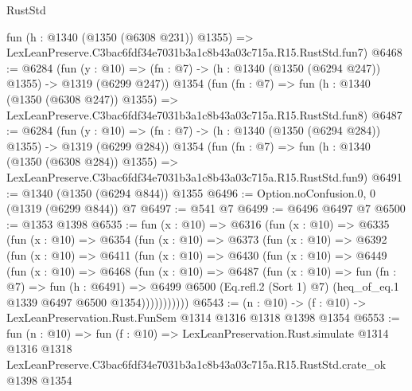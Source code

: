 \begin{lexlean}{RustStd}
\begin{coremodule}
    fun (h : @1340 (@1350 (@6308 @231)) @1355) =>
    LexLeanPreserve.C3bac6fdf34e7031b3a1c8b43a03c715a.R15.RustStd.fun7)
@6468 := @6284
    (fun (y : @10) => (fn : @7) -> (h : @1340 (@1350 (@6294 @247)) @1355) -> @1319 (@6299 @247))
    @1354
    (fun (fn : @7) =>
    fun (h : @1340 (@1350 (@6308 @247)) @1355) =>
    LexLeanPreserve.C3bac6fdf34e7031b3a1c8b43a03c715a.R15.RustStd.fun8)
@6487 := @6284
    (fun (y : @10) => (fn : @7) -> (h : @1340 (@1350 (@6294 @284)) @1355) -> @1319 (@6299 @284))
    @1354
    (fun (fn : @7) =>
    fun (h : @1340 (@1350 (@6308 @284)) @1355) =>
    LexLeanPreserve.C3bac6fdf34e7031b3a1c8b43a03c715a.R15.RustStd.fun9)
@6491 := @1340 (@1350 (@6294 @844)) @1355
@6496 := Option.noConfusion.{0, 0} (@1319 (@6299 @844)) @7
@6497 := @541 @7
@6499 := @6496 @6497 @7
@6500 := @1353 @1398
@6535 := fun (x : @10) =>
  @6316
    (fun (x : @10) =>
    @6335
      (fun (x : @10) =>
      @6354
        (fun (x : @10) =>
        @6373
          (fun (x : @10) =>
          @6392
            (fun (x : @10) =>
            @6411
              (fun (x : @10) =>
              @6430
                (fun (x : @10) =>
                @6449
                  (fun (x : @10) =>
                  @6468
                    (fun (x : @10) =>
                    @6487
                      (fun (x : @10) =>
                      fun (fn : @7) =>
                      fun (h : @6491) =>
                      @6499
                        @6500
                        (Eq.refl.{2} (Sort 1) @7)
                        (heq_of_eq.{1} @1339 @6497 @6500 @1354)))))))))))
@6543 := (n : @10) -> (f : @10) -> LexLeanPreservation.Rust.FunSem @1314 @1316 @1318 @1398 @1354
@6553 := fun (n : @10) =>
  fun (f : @10) =>
  LexLeanPreservation.Rust.simulate
    @1314
    @1316
    @1318
    LexLeanPreserve.C3bac6fdf34e7031b3a1c8b43a03c715a.R15.RustStd.crate_ok
    @1398
    @1354
\end{coremodule}
\end{lexlean}
